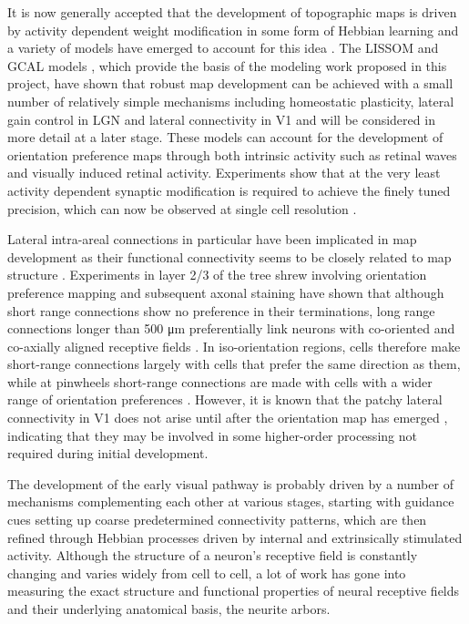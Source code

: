 It is now generally accepted that the development of topographic maps
is driven by activity dependent weight modification in some form of
Hebbian learning \citep{Shatz1996} and a variety of models have
emerged to account for this idea \citep{Bienenstock1982,
  Miller1989}. The LISSOM and GCAL models \citep{Bednar2003,
  Stevens2013}, which provide the basis of the modeling work proposed
in this project, have shown that robust map development can be
achieved with a small number of relatively simple mechanisms including
homeostatic plasticity, lateral gain control in LGN and lateral
connectivity in V1 \citep{Stevens2013} and will be considered in more
detail at a later stage. These models can account for the development
of orientation preference maps through both intrinsic activity such as
retinal waves \citep{Bednar2003} and visually induced retinal
activity. Experiments show that at the very least activity dependent
synaptic modification is required to achieve the finely tuned
precision, which can now be observed at single cell resolution
\citep{Ohki2005,White2007}.

Lateral intra-areal connections in particular have been implicated in
map development as their functional connectivity seems to be closely
related to map structure \citep{Gilbert1983}. Experiments in layer 2/3
of the tree shrew involving orientation preference mapping and
subsequent axonal staining have shown that although short range
connections show no preference in their terminations, long range
connections longer than 500 \si{\micro\metre} preferentially link
neurons with co-oriented and co-axially aligned receptive fields
\citep{Bosking1997}. In iso-orientation regions, cells therefore make
short-range connections largely with cells that prefer the same
direction as them, while at pinwheels short-range connections are made
with cells with a wider range of orientation preferences
\citep{Yousef2001}. However, it is known that the patchy lateral
connectivity in V1 does not arise until after the orientation map has
emerged \citep{Ruthazer1996}, indicating that they may be involved in
some higher-order processing not required during initial development.

The development of the early visual pathway is probably driven by a
number of mechanisms complementing each other at various stages,
starting with guidance cues setting up coarse predetermined
connectivity patterns, which are then refined through Hebbian
processes driven by internal and extrinsically stimulated
activity. Although the structure of a neuron's receptive field is
constantly changing and varies widely from cell to cell, a lot of work
has gone into measuring the exact structure and functional properties
of neural receptive fields and their underlying anatomical basis,
the neurite arbors.

